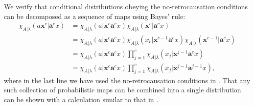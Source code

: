 \documentclass[10pt, a4paper]{article}
\numberwithin{equation}{section} %
\theoremstyle{definition}
\theoremstyle{plain}
\newcommand{\?}{\mathrel{?}} %
\newcommand{\cvec}[1]{\boldsymbol{\mathbf{#1}}}    %
\begin{document}
            We verify that conditional distributions obeying the no-retrocausation conditions can be decomposed as a sequence of maps using Bayes' rule:
                \begin{align}
                  \chi_{A|\lambda}(a\cvec{x}^c|\cvec{a}^cx) &= \chi_{A|\lambda}(a|\cvec{x}^c\cvec{a}^cx) \chi_{A|\lambda}(\cvec{x}^{c}|\cvec{a}^cx) \\
                                                         &= \chi_{A|\lambda}(a|\cvec{x}^c\cvec{a}^cx) \chi_{A|\lambda}(x_c|\cvec{x}^{c-1}\cvec{a}^cx) \chi_{A|\lambda}(\cvec{x}^{c-1}|\cvec{a}^cx) \\
                                                         &= \chi_{A|\lambda}(a|\cvec{x}^c\cvec{a}^cx) \prod_{j=1}^c \chi_{A|\lambda}(x_j|\cvec{x}^{j-1}\cvec{a}^cx) \\
                                                         &= \chi_{A|\lambda}(a|\cvec{x}^c\cvec{a}^{c}x) \prod_{j=1}^c \chi_{A|\lambda}(x_j|\cvec{x}^{j-1}\cvec{a}^{j-1}x),
                \end{align}
                where in the last line we have used the no-retrocausation conditions in . That any such collection of probabilistic maps can be combined into a single distribution can be shown with a calculation similar to that in .
\end{document}
